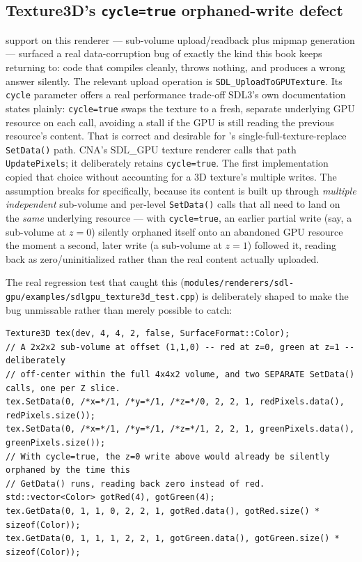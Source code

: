 \subsection{Texture3D's \texttt{cycle=true} orphaned-write defect}

 support on this renderer --- sub-volume upload/readback plus mipmap generation
--- surfaced a real data-corruption bug of exactly the kind this book keeps returning to: code that compiles cleanly, throws
nothing, and produces a wrong answer silently. The relevant upload operation is
\texttt{SDL\_UploadToGPUTexture}. Its \texttt{cycle} parameter offers a real performance
trade-off SDL3's own documentation states plainly: \texttt{cycle=true} swaps the texture to a
fresh, separate underlying GPU resource on each call, avoiding a stall if the GPU is still
reading the previous resource's content. That is correct and desirable for 's
single-full-texture-replace \texttt{SetData()} path. CNA's SDL\_GPU texture renderer calls that
path \texttt{UpdatePixels}; it deliberately retains \texttt{cycle=true}. The first
 implementation copied that choice without accounting for a 3D texture's
multiple writes.
The assumption breaks for  specifically, because its content is built up
through \emph{multiple independent} sub-volume and per-level \texttt{SetData()} calls that all
need to land on the \emph{same} underlying resource --- with \texttt{cycle=true}, an earlier
partial write (say, a sub-volume at $z=0$) silently orphaned itself onto an abandoned GPU
resource the moment a second, later write (a sub-volume at $z=1$) followed it, reading back as
zero/uninitialized rather than the real content actually uploaded.

The real regression test that caught this (\texttt{modules/renderers/sdl-gpu/examples/\allowbreak{}sdlgpu\_texture3d\_test.cpp})
is deliberately shaped to make the bug unmissable rather than merely possible to catch:

\begin{lstlisting}
Texture3D tex(dev, 4, 4, 2, false, SurfaceFormat::Color);
// A 2x2x2 sub-volume at offset (1,1,0) -- red at z=0, green at z=1 -- deliberately
// off-center within the full 4x4x2 volume, and two SEPARATE SetData() calls, one per Z slice.
tex.SetData(0, /*x=*/1, /*y=*/1, /*z=*/0, 2, 2, 1, redPixels.data(), redPixels.size());
tex.SetData(0, /*x=*/1, /*y=*/1, /*z=*/1, 2, 2, 1, greenPixels.data(), greenPixels.size());
// With cycle=true, the z=0 write above would already be silently orphaned by the time this
// GetData() runs, reading back zero instead of red.
std::vector<Color> gotRed(4), gotGreen(4);
tex.GetData(0, 1, 1, 0, 2, 2, 1, gotRed.data(), gotRed.size() * sizeof(Color));
tex.GetData(0, 1, 1, 1, 2, 2, 1, gotGreen.data(), gotGreen.size() * sizeof(Color));
\end{lstlisting}

